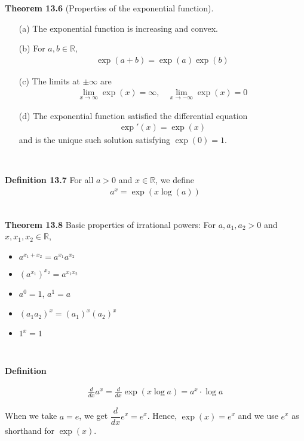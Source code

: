 \documentclass[11pt]{article}
\begin{document}
\textbf{Theorem 13.6} (Properties of the exponential function). 

\begin{enumerate}
    \item [(a)] The exponential function is increasing and convex. 
    
    \item [(b)] For $a,b \in \mathbb{R}$, 
    \begin{align*}
        \exp(a+b) = \exp(a)\exp(b)
    \end{align*}
    
    \item [(c)] The limits at $\pm \infty$ are
    \begin{align*}
        \lim_{x \to \infty} \exp(x) = \infty, ~~~~ \lim_{x \to -\infty} \exp(x) = 0
    \end{align*}
    
    \item [(d)] The exponential function satisfied the differential equation 
    \begin{align*}
        \exp'(x) = \exp(x)
    \end{align*}
    and is the unique such solution satisfying $\exp(0) =1$. 
\end{enumerate} 
\ 

\textbf{Definition 13.7} For all $a > 0$ and $x \in \mathbb{R}$, we define 
\begin{align*}
    a^x = \exp(x\log(a))
\end{align*}
\ 

\textbf{Theorem 13.8} Basic properties of irrational powers: For $a, a_1, a_2 > 0$ and $x, x_1, x_2 \in \mathbb{R}$, 

\begin{itemize}
    \item $a^{x_1+x_2} = a^{x_1}a^{x_2}$
    \item $(a^{x_1})^{x_2} = a^{x_1x_2}$
    \item $a^0 = 1$, $a^1 = a$
    \item $(a_1a_2)^x = (a_1)^x (a_2)^x$
    \item $1^x = 1$
\end{itemize} 
\ 

\textbf{Definition} 

\begin{align*}
    \frac{d}{dx}a^x = \frac{d}{dx}\exp{(x \log{a})} = a^x \cdot \log{a}
\end{align*}

When we take $a = e$, we get $\dfrac{d}{dx} e^x = e^x$. Hence, $\exp(x) = e^x$ and we use $e^x$ as shorthand for $\exp(x)$.
\end{document}
